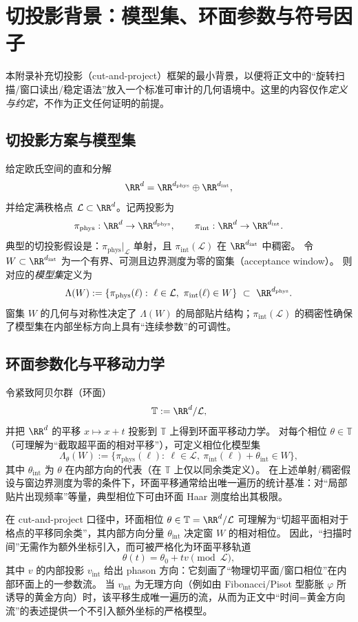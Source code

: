 \section{切投影背景：模型集、环面参数与符号因子}\label{app:cut_project_background}

本附录补充切投影（cut-and-project）框架的最小背景，以便将正文中的“旋转扫描/窗口读出/稳定语法”放入一个标准可审计的几何语境中。这里的内容仅作\emph{定义与约定}，不作为正文任何证明的前提。

\subsection{切投影方案与模型集}

给定欧氏空间的直和分解
\[
\RR^{d}=\RR^{d_{\mathrm{phys}}}\oplus \RR^{d_{\mathrm{int}}},
\]
并给定满秩格点 \(\mathcal{L}\subset \RR^{d}\)。记两投影为
\[
\pi_{\mathrm{phys}}:\RR^{d}\to \RR^{d_{\mathrm{phys}}},\qquad
\pi_{\mathrm{int}}:\RR^{d}\to \RR^{d_{\mathrm{int}}}.
\]
典型的切投影假设是：\(\pi_{\mathrm{phys}}|_{\mathcal{L}}\) 单射，且 \(\pi_{\mathrm{int}}(\mathcal{L})\) 在 \(\RR^{d_{\mathrm{int}}}\) 中稠密。
令 \(W\subset \RR^{d_{\mathrm{int}}}\) 为一个有界、可测且边界测度为零的窗集（acceptance window）。
则对应的\emph{模型集}定义为
\[
\Lambda(W):=\{\pi_{\mathrm{phys}}(\ell):\ \ell\in\mathcal{L},\ \pi_{\mathrm{int}}(\ell)\in W\}\ \subset\ \RR^{d_{\mathrm{phys}}}.
\]
窗集 \(W\) 的几何与对称性决定了 \(\Lambda(W)\) 的局部贴片结构；\(\pi_{\mathrm{int}}(\mathcal{L})\) 的稠密性确保了模型集在内部坐标方向上具有“连续参数”的可调性。

\subsection{环面参数化与平移动力学}

令紧致阿贝尔群（环面）
\[
\mathbb{T}:=\RR^{d}/\mathcal{L},
\]
并把 \(\RR^{d}\) 的平移 \(x\mapsto x+t\) 投影到 \(\mathbb{T}\) 上得到环面平移动力学。
对每个相位 \(\theta\in\mathbb{T}\)（可理解为“截取超平面的相对平移”），可定义相位化模型集
\[
\Lambda_\theta(W):=\{\pi_{\mathrm{phys}}(\ell):\ \ell\in\mathcal{L},\ \pi_{\mathrm{int}}(\ell)+\theta_{\mathrm{int}}\in W\},
\]
其中 \(\theta_{\mathrm{int}}\) 为 \(\theta\) 在内部方向的代表（在 \(\mathbb{T}\) 上仅以同余类定义）。
在上述单射/稠密假设与窗边界测度为零的条件下，环面平移通常给出唯一遍历的统计基准：对“局部贴片出现频率”等量，典型相位下可由环面 Haar 测度给出其极限。

\begin{remark}\label{rem:app-cutproject-phason-time}
在 cut-and-project 口径中，环面相位 \(\theta\in\mathbb{T}=\RR^{d}/\mathcal{L}\) 可理解为“切超平面相对于格点的平移同余类”，其内部方向分量 \(\theta_{\mathrm{int}}\) 决定窗 \(W\) 的相对相位。
因此，“扫描时间”无需作为额外坐标引入，而可被严格化为环面平移轨道
\[
\theta(t)=\theta_0+t v\pmod{\mathcal{L}},
\]
其中 \(v\) 的内部投影 \(v_{\mathrm{int}}\) 给出 phason 方向：它刻画了“物理切平面/窗口相位”在内部环面上的一参数流。
当 \(v_{\mathrm{int}}\) 为无理方向（例如由 Fibonacci/Pisot 型膨胀 \(\varphi\) 所诱导的黄金方向）时，该平移生成唯一遍历的流，从而为正文中“时间=黄金方向流”的表述提供一个不引入额外坐标的严格模型。
\end{remark}

